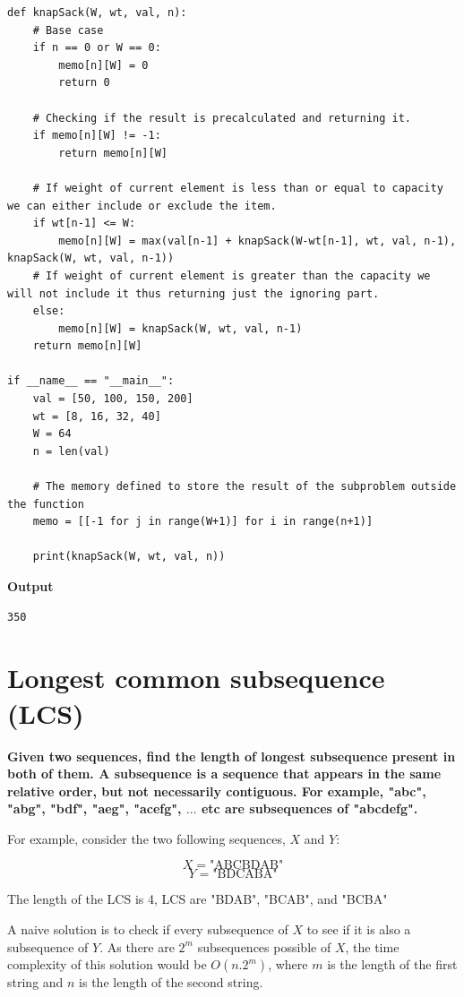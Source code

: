 \documentclass[a4paper,11pt]{book}
\begin{document}
\begin{lstlisting}
def knapSack(W, wt, val, n):
    # Base case
    if n == 0 or W == 0:
        memo[n][W] = 0
        return 0

    # Checking if the result is precalculated and returning it.
    if memo[n][W] != -1:
        return memo[n][W]

    # If weight of current element is less than or equal to capacity we can either include or exclude the item.
    if wt[n-1] <= W:
        memo[n][W] = max(val[n-1] + knapSack(W-wt[n-1], wt, val, n-1), knapSack(W, wt, val, n-1))
    # If weight of current element is greater than the capacity we will not include it thus returning just the ignoring part. 
    else:
        memo[n][W] = knapSack(W, wt, val, n-1)
    return memo[n][W]

if __name__ == "__main__":
    val = [50, 100, 150, 200]
    wt = [8, 16, 32, 40]
    W = 64
    n = len(val)

    # The memory defined to store the result of the subproblem outside the function
    memo = [[-1 for j in range(W+1)] for i in range(n+1)]

    print(knapSack(W, wt, val, n))
\end{lstlisting}
\textbf{Output}
\begin{lstlisting}
350
\end{lstlisting}

\section{Longest common subsequence (LCS)}

\noindent \textbf{Given two sequences, find the length of longest subsequence present in both of them. A subsequence is a sequence that appears in the same relative order, but not necessarily contiguous. For example, "abc", "abg", "bdf", "aeg", "acefg", $\dots$ etc are subsequences of "abcdefg".}

\vspace{5mm}

\noindent For example, consider the two following sequences, $X$ and $Y$:

$$X = \text{"ABCBDAB"}$$
$$Y =  \text{"BDCABA"}$$

\noindent The length of the LCS is 4, LCS are "BDAB", "BCAB", and "BCBA"

\vspace{3mm}

\noindent A naive solution is to check if every subsequence of $X$ to see if it is also a subsequence of $Y$. As there are $2^m$ subsequences possible of $X$, the time complexity of this solution would be $O(n.2^m)$, where $m$ is the length of the first string and $n$ is the length of the second string.
\end{document}

